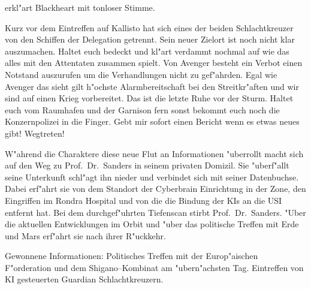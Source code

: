 erkl"art Blackheart mit tonloser Stimme. 

\begin{speech}
	Kurz vor dem Eintreffen auf Kallisto hat sich eines der beiden Schlachtkreuzer von den Schiffen der Delegation getrennt. Sein neuer Zielort ist noch nicht klar auszumachen. Haltet euch bedeckt und kl"art verdammt nochmal auf wie das alles mit den Attentaten zusammen spielt. Von Avenger besteht ein Verbot einen Notstand auszurufen um die Verhandlungen nicht zu gef"ahrden. Egal wie Avenger das sieht gilt h"ochste Alarmbereitschaft bei den Streitkr"aften und wir sind auf einen Krieg vorbereitet. Das ist die letzte Ruhe vor der Sturm. Haltet euch vom Raumhafen und der Garnison fern sonst bekommt euch noch die Konzernpolizei in die Finger. Gebt mir sofort einen Bericht wenn es etwas neues gibt! Wegtreten!
\end{speech}

W"ahrend die Charaktere diese neue Flut an Informationen "uberrollt macht sich \xl{} auf den Weg zu Prof.~Dr.~Sanders in seinem privaten Domizil. Sie "uberf"allt seine Unterkunft schl"agt ihn nieder und verbindet sich mit seiner Datenbuchse. Dabei erf"ahrt sie von dem Standort der Cyberbrain Einrichtung in der Zone, den Eingriffen im Rondra Hospital und von \emph{} die die Bindung der KIs an die USI entfernt hat. Bei dem durchgef"uhrten Tiefenscan stirbt Prof.~Dr.~Sanders. "Uber die aktuellen Entwicklungen im Orbit und "uber das politische Treffen mit Erde und Mars erf"ahrt sie nach ihrer R"uckkehr.

\begin{remarks}
	Gewonnene Informationen: Politisches Treffen mit der Europ"aischen F"orderation und dem Shigano--Kombinat am "ubern"achsten Tag. Eintreffen von KI gesteuerten Guardian Schlachtkreuzern.
\end{remarks}
